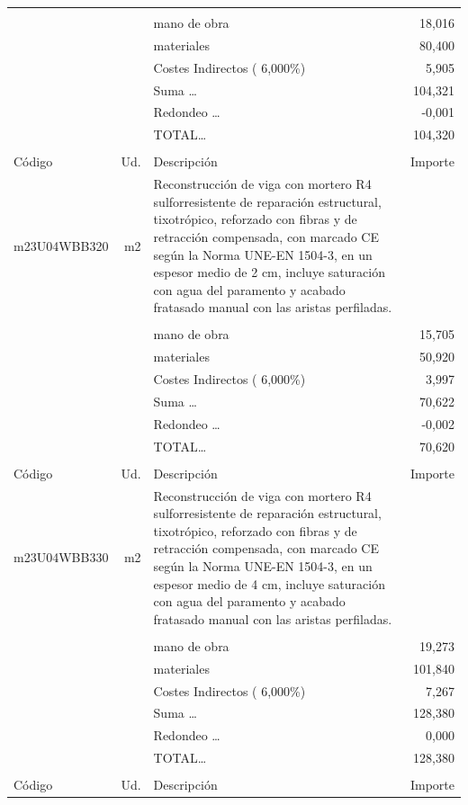 \documentclass{book}%
\begin{document}
\begin{supertabular}{l r p{60mm} r}
&&&\\%
&&mano de obra&    18,016\\%
&&materiales&    80,400\\%
&&Costes Indirectos (     6,000\%)&     5,905\\%
&&Suma \ldots&   104,321\\%
&&Redondeo \ldots&    {-}0,001\\%
%
&&TOTAL\ldots&   104,320\\%
&&&\\%
Código&Ud.&Descripción&Importe\\%
\hline%
m23U04WBB320&m2&Reconstrucción de viga con mortero R4 sulforresistente de reparación estructural, tixotrópico, reforzado con fibras y de retracción compensada, con marcado CE según la Norma UNE{-}EN 1504{-}3, en un espesor medio de 2 cm, incluye saturación con agua del paramento y acabado fratasado manual con las aristas perfiladas.&\\%
&&&\\%
&&mano de obra&    15,705\\%
&&materiales&    50,920\\%
&&Costes Indirectos (     6,000\%)&     3,997\\%
&&Suma \ldots&    70,622\\%
&&Redondeo \ldots&    {-}0,002\\%
%
&&TOTAL\ldots&    70,620\\%
&&&\\%
Código&Ud.&Descripción&Importe\\%
\hline%
m23U04WBB330&m2&Reconstrucción de viga con mortero R4 sulforresistente de reparación estructural, tixotrópico, reforzado con fibras y de retracción compensada, con marcado CE según la Norma UNE{-}EN 1504{-}3, en un espesor medio de 4 cm, incluye saturación con agua del paramento y acabado fratasado manual con las aristas perfiladas.&\\%
&&&\\%
&&mano de obra&    19,273\\%
&&materiales&   101,840\\%
&&Costes Indirectos (     6,000\%)&     7,267\\%
&&Suma \ldots&   128,380\\%
&&Redondeo \ldots&     0,000\\%
%
&&TOTAL\ldots&   128,380\\%
&&&\\%
Código&Ud.&Descripción&Importe\\%

\end{supertabular}
\end{document}
